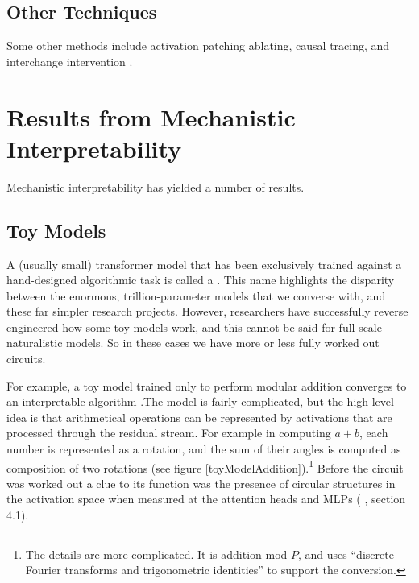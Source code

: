 \subsection{Other Techniques}


Some other methods include activation patching ablating,  causal tracing, and
interchange intervention .

\section{Results from Mechanistic Interpretability}

Mechanistic interpretability has yielded a number of results.

\subsection{Toy Models}

A (usually small) transformer model that has been exclusively trained against a
hand-designed algorithmic task is called a . This name
highlights the disparity between the enormous, trillion-parameter models that
we converse with, and these far simpler research projects. However, researchers
have successfully reverse engineered how some toy models work, and this cannot
be said for full-scale naturalistic models.  So in these cases we have more or
less fully worked out circuits.

For example, a toy model trained only to perform modular addition converges to
an interpretable algorithm \cite{nanda2023progress}.The model is fairly
complicated, but the high-level idea is that arithmetical operations can be
represented by activations that are processed through the residual stream. For
example in computing $a + b$, each number is represented as a rotation, and the
sum of their angles is computed as composition of two rotations (see figure
\ref{toyModelAddition}).\footnote{The details are more complicated. It is
addition mod $P$, and uses ``discrete Fourier transforms and trigonometric
identities'' \cite{nanda2023progress} to support the conversion.} Before the
circuit was worked out a clue to its function was the presence of circular
structures in the activation space when measured at the attention heads and
MLPs (\cite{nanda2023progress} , section 4.1).

